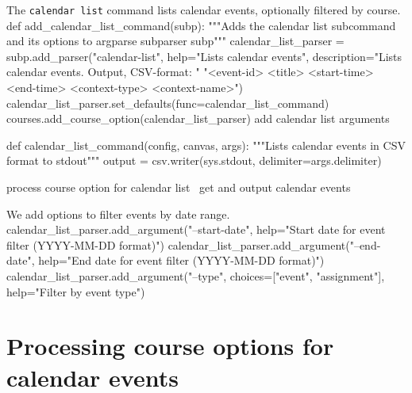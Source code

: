 The \texttt{calendar list} command lists calendar events, optionally filtered by course.
\nwenddocs{}\endmoddef\nwstartdeflinemarkup{}\nwenddeflinemarkup
def add_calendar_list_command(subp):
  """Adds the calendar list subcommand and its options to argparse subparser subp"""
  calendar_list_parser = subp.add_parser("calendar-list",
    help="Lists calendar events",
    description="Lists calendar events. Output, CSV-format: "
      "<event-id> <title> <start-time> <end-time> <context-type> <context-name>")
  calendar_list_parser.set_defaults(func=calendar_list_command)
  courses.add_course_option(calendar_list_parser)
  \LA{}add calendar list arguments~{\nwtagstyle{}}\RA{}

def calendar_list_command(config, canvas, args):
  """Lists calendar events in CSV format to stdout"""
  output = csv.writer(sys.stdout, delimiter=args.delimiter)
  
  \LA{}process course option for calendar list~{\nwtagstyle{}}\RA{}
  \LA{}get and output calendar events~{\nwtagstyle{}}\RA{}
\nwendcode{}\nwdocspar

We add options to filter events by date range.
\nwenddocs{}\endmoddef\nwstartdeflinemarkup{}\nwenddeflinemarkup
calendar_list_parser.add_argument("--start-date",
  help="Start date for event filter (YYYY-MM-DD format)")
calendar_list_parser.add_argument("--end-date", 
  help="End date for event filter (YYYY-MM-DD format)")
calendar_list_parser.add_argument("--type",
  choices=["event", "assignment"],
  help="Filter by event type")
\nwendcode{}\nwdocspar


\section{Processing course options for calendar events}

